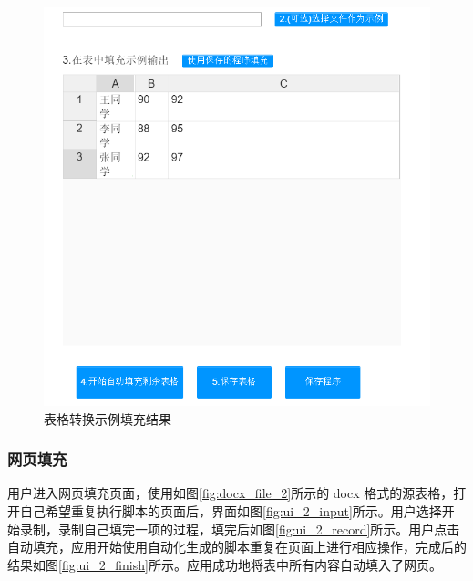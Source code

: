 \documentclass[design, pageheader]{njubachelor}
\begin{document}
\begin{figure}
    \centering
    \includegraphics[width=15cm,keepaspectratio]{figures/ui_1_finish.png}
    \caption{表格转换示例填充结果}
    \label{fig:ui_1_finish}
\end{figure}

\subsubsection{网页填充}
用户进入网页填充页面，使用如图\ref{fig:docx_file_2}所示的 docx 格式的源表格，打开自己希望重复执行脚本的页面后，界面如图\ref{fig:ui_2_input}所示。用户选择开始录制，录制自己填完一项的过程，填完后如图\ref{fig:ui_2_record}所示。用户点击自动填充，应用开始使用自动化生成的脚本重复在页面上进行相应操作，完成后的结果如图\ref{fig:ui_2_finish}所示。应用成功地将表中所有内容自动填入了网页。
\end{document}
